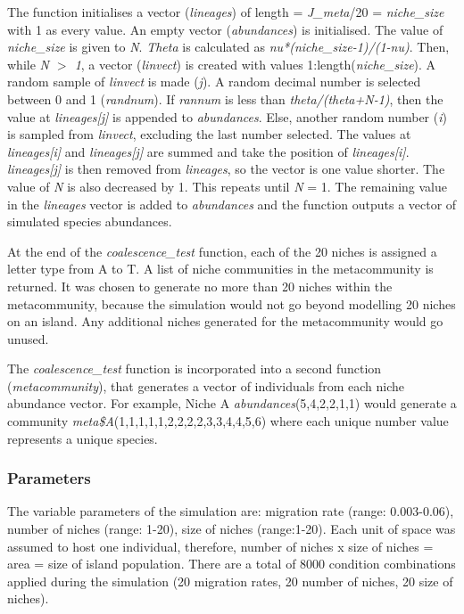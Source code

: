 \documentclass{article}
\begin{document}
\noindent The function initialises a vector (\textit{lineages}) of length = \textit{J\_meta}/20 = \textit{niche\_size} with 1 as every value. An empty vector (\textit{abundances}) is initialised. The value of \textit{niche\_size} is given to \textit{N}. \textit{Theta} is calculated as \textit{nu*(niche\_size-1)/(1-nu)}. Then, while \textit{N $>$ 1}, a vector (\textit{linvect}) is created with values 1:length(\textit{niche\_size}). A random sample of \textit{linvect} is made (\textit{j}). A random decimal number is selected between 0 and 1 (\textit{randnum}). If \textit{rannum} is less than \textit{theta/(theta+N-1)}, then the value at \textit{lineages[j]} is appended to \textit{abundances}. Else, another random number (\textit{i}) is sampled from \textit{linvect}, excluding the last number selected. The values at \textit{lineages[i]} and \textit{lineages[j]} are summed and take the position of \textit{lineages[i]}. \textit{lineages[j]} is then removed from \textit{lineages}, so the vector is one value shorter. The value of \textit{N} is also decreased by 1. This repeats until \textit{N} = 1. The remaining value in the \textit{lineages} vector is added to \textit{abundances} and the function outputs a vector of simulated species abundances.\bigskip

\noindent At the end of the \textit{coalescence\_test} function, each of the 20 niches is assigned a letter type from A to T. A list of niche communities in the metacommunity is returned. It was chosen to generate no more than 20 niches within the metacommunity, because the simulation would not go beyond modelling 20 niches on an island. Any additional niches generated for the metacommunity would go unused. \bigskip

\noindent The \textit{coalescence\_test} function is incorporated into a second function (\textit{metacommunity}), that generates a vector of individuals from each niche abundance vector. For example, Niche A \textit{abundances}(5,4,2,2,1,1) would generate a community \textit{meta\$A}(1,1,1,1,1,2,2,2,2,3,3,4,4,5,6) where each unique number value represents a unique species.%

\subsubsection{Parameters}
The variable parameters of the simulation are: migration rate (range: 0.003-0.06), number of niches (range: 1-20), size of niches (range:1-20). Each unit of space was assumed to host one individual, therefore, number of niches x size of niches = area = size of island population. There are a total of 8000 condition combinations applied during the simulation (20 migration rates, 20 number of niches, 20 size of niches). 
\end{document}
